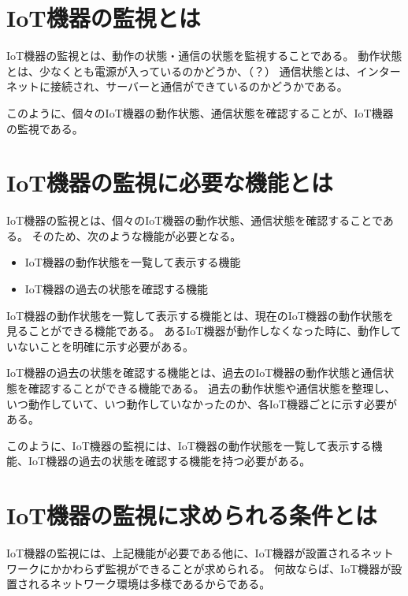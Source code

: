 \section{IoT機器の監視とは}
IoT機器の監視とは、動作の状態・通信の状態を監視することである。
動作状態とは、少なくとも電源が入っているのかどうか、（？）
通信状態とは、インターネットに接続され、サーバーと通信ができているのかどうかである。

このように、個々のIoT機器の動作状態、通信状態を確認することが、IoT機器の監視である。

\section{IoT機器の監視に必要な機能とは}
IoT機器の監視とは、個々のIoT機器の動作状態、通信状態を確認することである。
そのため、次のような機能が必要となる。
\begin{itemize}
	\item IoT機器の動作状態を一覧して表示する機能
	\item IoT機器の過去の状態を確認する機能
\end{itemize}

IoT機器の動作状態を一覧して表示する機能とは、現在のIoT機器の動作状態を見ることができる機能である。
あるIoT機器が動作しなくなった時に、動作していないことを明確に示す必要がある。

IoT機器の過去の状態を確認する機能とは、過去のIoT機器の動作状態と通信状態を確認することができる機能である。
過去の動作状態や通信状態を整理し、いつ動作していて、いつ動作していなかったのか、各IoT機器ごとに示す必要がある。

このように、IoT機器の監視には、IoT機器の動作状態を一覧して表示する機能、IoT機器の過去の状態を確認する機能を持つ必要がある。

\section{IoT機器の監視に求められる条件とは}
IoT機器の監視には、上記機能が必要である他に、IoT機器が設置されるネットワークにかかわらず監視ができることが求められる。
何故ならば、IoT機器が設置されるネットワーク環境は多様であるからである。

